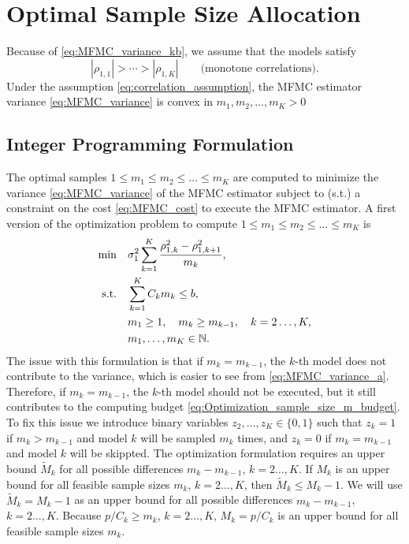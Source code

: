 \section{Optimal Sample Size Allocation}\label{sec:MFMC_mk_optimize}
Because of \eqref{eq:MFMC_variance_kb}, we assume that the models satisfy
\begin{equation} \label{eq:correlation_assumption}
         |\rho_{1,1}| > \cdots > |\rho_{1,K}| \qquad \text{(monotone correlations)}.
\end{equation}
Under the assumption \eqref{eq:correlation_assumption}, the 
MFMC estimator  variance \eqref{eq:MFMC_variance} is convex in $m_1,  m_2,  \ldots,  m_K > 0$ 


\subsection{Integer Programming Formulation}  \label{sec:MFMC_mk_optimize_IP}
The optimal samples $1 \le m_1 \le m_2 \le \ldots \le m_K$ are computed to minimize
the variance \eqref{eq:MFMC_variance} of the MFMC estimator
subject to (s.t.) a constraint on the cost \eqref{eq:MFMC_cost} to execute the MFMC estimator.
A first version of the optimization problem to compute $1 \le m_1 \le m_2 \le \ldots \le m_K$ is
\begin{subequations}\label{eq:Optimization_sample_size_N}
    \begin{align}
    \min \quad &\sigma_1^2  \sum_{k=1}^K \frac{ \rho_{1,k}^2 - \rho_{1,k+1}^2}{m_k},   \\
       \text{s.t.}\quad & \sum_{k=1}^K C_km_k \le b,       \label{eq:Optimization_sample_size_m_budget}  \\
                                & m_1\ge 1,\quad  m_k \ge m_{k-1}, \quad k=2\ldots,K,\\
                                &m_1,\ldots, m_K\in \mathbb{N}.
    \end{align}
\end{subequations}
The issue with this formulation is that if $m_k = m_{k-1}$, the $k$-th model
does not contribute to the variance, which is easier to see from \eqref{eq:MFMC_variance_a}.
Therefore, if $m_k = m_{k-1}$, the $k$-th model should not be executed, but it still contributes to
the computing budget \eqref{eq:Optimization_sample_size_m_budget}.
To fix this issue we introduce binary variables $z_2, \ldots, z_K \in \{0,1\}$ such that
$z_k = 1$ if $m_k > m_{k-1}$ and model $k$ will be sampled $m_k$ times, and 
$z_k = 0$ if $m_k = m_{k-1}$ and model $k$ will be skippted.
The optimization formulation requires 
an upper bound $\tilde{M}_k$ for all possible differences $m_k - m_{k-1}$, $k=2\ldots,K$.
If  $M_k$ is an upper bound for all feasible sample sizes  $m_k$, $k=2\ldots,K$,
then $\tilde{M}_k \le M_k-1$. We will use $\tilde{M}_k = M_k-1$ as an upper bound  
for all possible differences $m_k - m_{k-1}$, $k=2\ldots,K$.
Because $p/ C_k \ge m_k$, $k=2\ldots,K$, $M_k = p/ C_k$ is an upper bound for all feasible sample sizes  $m_k$.

